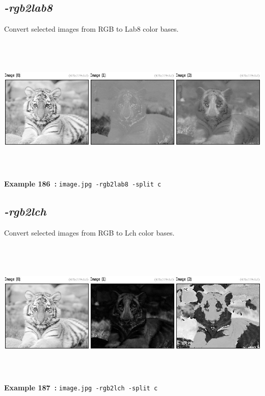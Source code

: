\documentclass[a4paper,11pt,twoside]{book}
\begin{document}
\subsection{\emph{-rgb2lab8} }\vspace*{-0.5em}
Convert selected images from RGB to Lab8 color bases.
\begin{center}\includegraphics[keepaspectratio=true,height=7cm,width=\textwidth]{img/gmic_def186.jpg}\\
{\footnotesize \textbf{Example 186~:} \texttt{image.jpg -rgb2lab8 -split c}}
\end{center}

\subsection{\emph{-rgb2lch} }\vspace*{-0.5em}
Convert selected images from RGB to Lch color bases.
\begin{center}\includegraphics[keepaspectratio=true,height=7cm,width=\textwidth]{img/gmic_def187.jpg}\\
{\footnotesize \textbf{Example 187~:} \texttt{image.jpg -rgb2lch -split c}}
\end{center}
\end{document}
